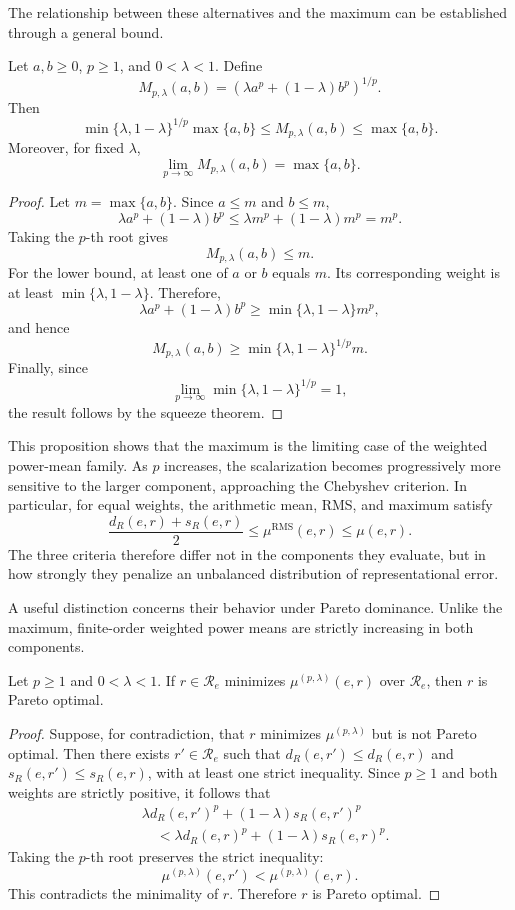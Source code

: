 The relationship between these alternatives and the maximum can be established through a general bound.

\begin{proposition}
\label{prop:miscoding_power_mean_bounds}
Let $a,b\ge 0$, $p\ge 1$, and $0<\lambda<1$. Define
\[
M_{p,\lambda}(a,b) = \left(\lambda a^p+(1-\lambda)b^p \right)^{1/p}.
\]
Then
\[
\min\{\lambda,1-\lambda\}^{1/p} \max\{a,b\} \le M_{p,\lambda}(a,b) \le \max\{a,b\}.
\]
Moreover, for fixed $\lambda$,
\[
\lim_{p\to\infty}M_{p,\lambda}(a,b) = \max\{a,b\}.
\]
\end{proposition}
\begin{proof}
Let $m=\max\{a,b\}$. Since $a\le m$ and $b\le m$,
\[
\lambda a^p+(1-\lambda)b^p \le \lambda m^p+(1-\lambda)m^p = m^p.
\]
Taking the $p$-th root gives
\[
M_{p,\lambda}(a,b)\le m.
\]
For the lower bound, at least one of $a$ or $b$ equals $m$. Its corresponding weight is at least $\min\{\lambda,1-\lambda\}$. Therefore,
\[
\lambda a^p+(1-\lambda)b^p \ge \min\{\lambda,1-\lambda\}m^p,
\]
and hence
\[
M_{p,\lambda}(a,b) \ge \min\{\lambda,1-\lambda\}^{1/p}m.
\]
Finally, since
\[
\lim_{p\to\infty} \min\{\lambda,1-\lambda\}^{1/p} = 1,
\]
the result follows by the squeeze theorem.
\end{proof}

This proposition shows that the maximum is the limiting case of the weighted power-mean family. As $p$ increases, the scalarization becomes progressively more sensitive to the larger component, approaching the Chebyshev criterion. In particular, for equal weights, the arithmetic mean, RMS, and maximum satisfy
\[
\frac{d_R(e,r)+s_R(e,r)}{2} \le \mu^{\mathrm{RMS}}(e,r) \le \mu(e,r).
\]
The three criteria therefore differ not in the components they evaluate, but in how strongly they penalize an unbalanced distribution of representational error.

A useful distinction concerns their behavior under Pareto dominance. Unlike the maximum, finite-order weighted power means are strictly increasing in both components.

\begin{proposition}
\label{prop:miscoding_power_mean_pareto}
Let $p\ge 1$ and $0<\lambda<1$. If $r\in\mathcal R_e$ minimizes $\mu^{(p,\lambda)}(e,r)$ over $\mathcal R_e$,
then $r$ is Pareto optimal.
\end{proposition}
\begin{proof}
Suppose, for contradiction, that $r$ minimizes $\mu^{(p,\lambda)}$ but is not Pareto optimal. Then there exists $r'\in\mathcal R_e$ such that $d_R(e,r')\le d_R(e,r)$ and $s_R(e,r')\le s_R(e,r)$, with at least one strict inequality. Since $p\ge 1$ and both weights are strictly positive, it follows that
\[
\begin{aligned}
&\lambda d_R(e,r')^p + (1-\lambda)s_R(e,r')^p \\
&\quad<\lambda d_R(e,r)^p+(1-\lambda)s_R(e,r)^p.
\end{aligned}
\]
Taking the $p$-th root preserves the strict inequality:
\[
\mu^{(p,\lambda)}(e,r') < \mu^{(p,\lambda)}(e,r).
\]
This contradicts the minimality of $r$. Therefore $r$ is Pareto optimal.
\end{proof}

